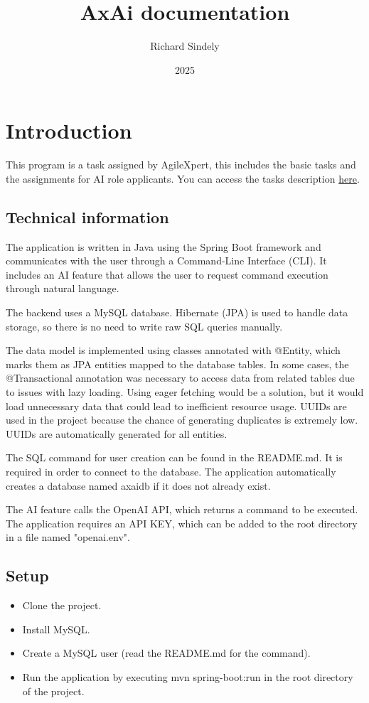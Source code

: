 \documentclass[12pt]{article}
\author{Richard Sindely}
\title{AxAi documentation}
\date{2025}
\begin{document}
\maketitle
\newpage
\tableofcontents
\newpage
\section{Introduction}
\label{int}

This program is a task assigned by AgileXpert, this includes the basic tasks and the assignments for AI role applicants. You can access the tasks description \href{https://agilexpert.hu/megoldando-problema-leirasa/}{here}.
\subsection{Technical information}

The application is written in Java using the Spring Boot framework and communicates with the user through a Command-Line Interface (CLI). It includes an AI feature that allows the user to request command execution through natural language.

The backend uses a MySQL database. Hibernate (JPA) is used to handle data storage, so there is no need to write raw SQL queries manually.

The data model is implemented using classes annotated with @Entity, which marks them as JPA entities mapped to the database tables.
In some cases, the @Transactional annotation was necessary to access data from related tables due to issues with lazy loading. Using eager fetching would be a solution, but it would load unnecessary data that could lead to inefficient resource usage. UUIDs are used in the project because the chance of generating duplicates is extremely low. UUIDs are automatically generated for all entities.

The SQL command for user creation can be found in the README.md. It is required in order to connect to the database. The application automatically creates a database named axaidb if it does not already exist.

The AI feature calls the OpenAI API, which returns a command to be executed. The application requires an API KEY, which can be added to the root directory in a file named "openai.env".

\subsection{Setup}
\begin{itemize}
	\item Clone the project.
	\item Install MySQL.
	\item Create a MySQL user (read the README.md for the command).
	\item Run the application by executing mvn spring-boot:run in the root directory of the project.
\end{itemize}
\newpage
\end{document}
